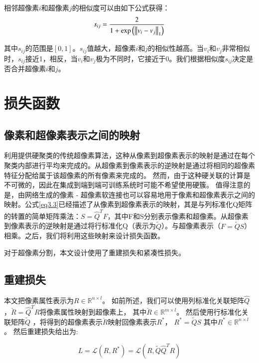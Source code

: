 相邻超像素$i$和超像素$j$的相似度可以由如下公式获得：
\begin{equation}
s_{ij} = \frac{2}{1+{\rm exp}\left ( \left \| v_{i}-v_{j}\right \|_{1}\right )}
\label{eq3.6}
\end{equation}

其中$s_{ij}$的范围是$[0,1]$。$s_{ij}$值越大，超像素$i$和$j$的相似性越高。当$v_{i}$和$v_{j}$非常相似时，$s_{ij}$接近1，相反，当$v_{i}$和$v_{j}$极为不同时，它接近于0。我们根据相似度$s_{ij}$决定是否合并超像素$i$和$j$。

\section{损失函数}

\subsection{像素和超像素表示之间的映射}

利用提供硬聚类的传统超像素算法，这种从像素到超像素表示的映射是通过在每个聚类内部进行平均来完成的。从超像素到像素表示的逆映射是通过将相同的超像素特征分配给属于该超像素的所有像素来完成的。
然而，由于这种硬关联的计算是不可微的，因此在集成到端到端可训练系统时可能不希望使用硬簇。
值得注意的是，由网络生成的像素 - 超像素软连接也可以容易地用于像素和超像素表示之间的映射。公式\ref{eq3.3}已经描述了从像素到超像素表示的映射，其是与列标准化Q矩阵的转置的简单矩阵乘法：$S=\hat{Q}^{T}F$，其中F和S分别表示像素和超像素。从超像素到像素表示的逆映射是通过将行标准化Q（表示为$\tilde{Q}$）。与超像素表示（$F = \tilde{Q}S$）相乘。之后，我们将利用这些映射来设计损失函数。

对于超像素分割，本文设计使用了重建损失和紧凑性损失。
\subsection{重建损失}

本文把像素属性表示为$R\in \mathbb{R}^{n\times l}$。
如前所述，我们可以使用列标准化关联矩阵$\hat{Q}$，$\breve{R}=\hat{Q}^{T}R$将像素属性映射到超像素上，
其中$\breve{R}\in \mathbb{R}^{m\times l}$。
然后使用行标准化关联矩阵$\tilde{Q}$ ，将得到的超像素表示$\breve{R}$映射回像素表示$R^{\ast }$，
$R^{\ast } = \tilde{Q}S$ 其中$R^{\ast } \in \mathbb{R}^{n\times l}$。
然后重建损失给出为:

\begin{equation}
L = \mathscr{L}(R,R^{*}) = \mathscr{L}(R,\tilde{Q}\hat{Q}^{T}R)
\end{equation}

